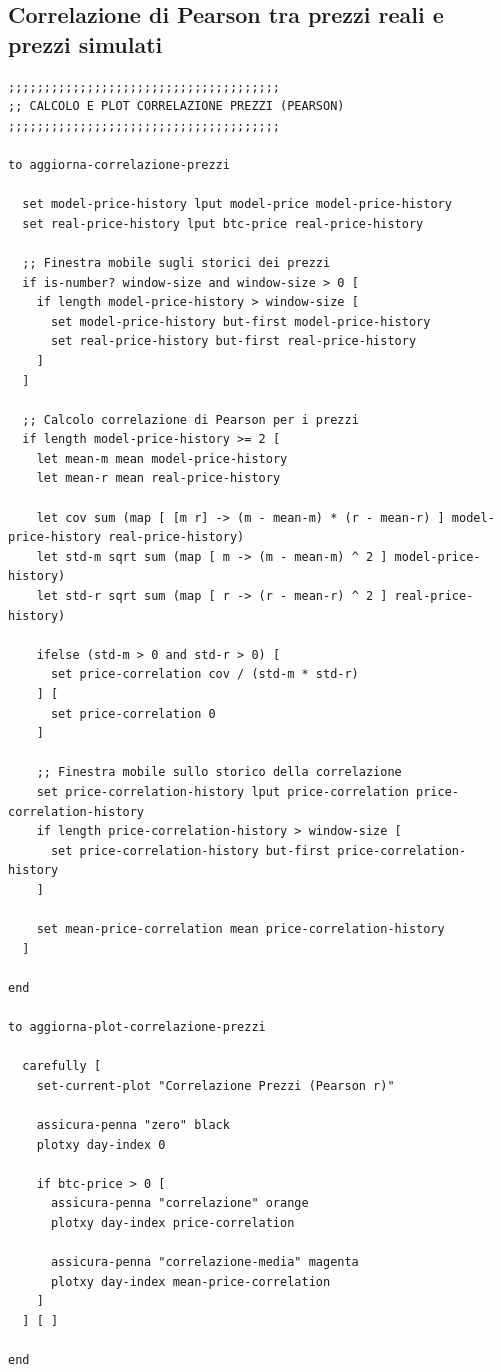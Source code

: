 \subsection{Correlazione di Pearson tra prezzi reali e prezzi simulati}

\begin{lstlisting}[caption={Calcolo della correlazione di Pearson sui prezzi e aggiornamento del relativo plot}]
;;;;;;;;;;;;;;;;;;;;;;;;;;;;;;;;;;;;;;
;; CALCOLO E PLOT CORRELAZIONE PREZZI (PEARSON)
;;;;;;;;;;;;;;;;;;;;;;;;;;;;;;;;;;;;;;

to aggiorna-correlazione-prezzi

  set model-price-history lput model-price model-price-history
  set real-price-history lput btc-price real-price-history

  ;; Finestra mobile sugli storici dei prezzi
  if is-number? window-size and window-size > 0 [
    if length model-price-history > window-size [
      set model-price-history but-first model-price-history
      set real-price-history but-first real-price-history
    ]
  ]

  ;; Calcolo correlazione di Pearson per i prezzi
  if length model-price-history >= 2 [
    let mean-m mean model-price-history
    let mean-r mean real-price-history

    let cov sum (map [ [m r] -> (m - mean-m) * (r - mean-r) ] model-price-history real-price-history)
    let std-m sqrt sum (map [ m -> (m - mean-m) ^ 2 ] model-price-history)
    let std-r sqrt sum (map [ r -> (r - mean-r) ^ 2 ] real-price-history)

    ifelse (std-m > 0 and std-r > 0) [
      set price-correlation cov / (std-m * std-r)
    ] [
      set price-correlation 0
    ]

    ;; Finestra mobile sullo storico della correlazione
    set price-correlation-history lput price-correlation price-correlation-history
    if length price-correlation-history > window-size [
      set price-correlation-history but-first price-correlation-history
    ]

    set mean-price-correlation mean price-correlation-history
  ]

end

to aggiorna-plot-correlazione-prezzi

  carefully [
    set-current-plot "Correlazione Prezzi (Pearson r)"

    assicura-penna "zero" black
    plotxy day-index 0

    if btc-price > 0 [
      assicura-penna "correlazione" orange
      plotxy day-index price-correlation

      assicura-penna "correlazione-media" magenta
      plotxy day-index mean-price-correlation
    ]
  ] [ ]

end
\end{lstlisting}

